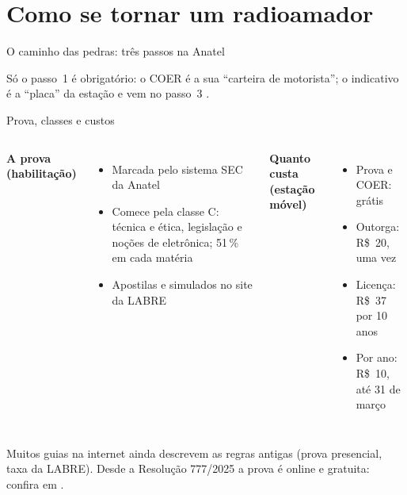 
\section{Como se tornar um radioamador}

\begin{frame}{O caminho das pedras: três passos na Anatel}
  \centering

  \smallskip
  \raggedright\small
  Só o passo~1 é obrigatório: o \alert{COER} é a sua ``carteira de motorista''; o indicativo é a
  ``placa'' da estação e vem no passo~3 \citep{anatel2026}.
\end{frame}

\begin{frame}{Prova, classes e custos}
  \small
  \begin{columns}[T,onlytextwidth]
      \textbf{A prova (habilitação)}
      \begin{itemize}
      \item Marcada pelo sistema SEC da Anatel
      \item Comece pela \alert{classe C}: técnica e ética, legislação e noções de eletrônica;
        51\,\% em cada matéria
      \item Apostilas e simulados no site da LABRE
      \end{itemize}
      \textbf{Quanto custa (estação móvel)}
      \begin{itemize}
      \item Prova e COER: \alert{grátis}
      \item Outorga: R\$~20, uma vez
      \item Licença: R\$~37 por 10 anos
      \item Por ano: R\$~10, até 31 de março
      \end{itemize}
  \end{columns}

  \smallskip
  \begin{atencao}
    Muitos guias na internet ainda descrevem as regras antigas (prova presencial, taxa da LABRE).
    Desde a Resolução 777/2025 a prova é online e gratuita: confira em
    .
  \end{atencao}
\end{frame}


